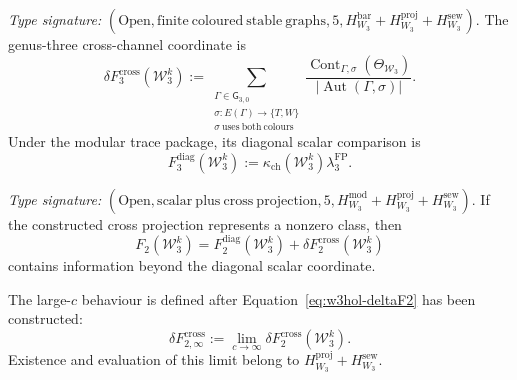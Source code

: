\begin{proposition}
\label{prop:w3hol-deltaF3-finite-window}
\emph{Type signature:}
\((\mathrm{Open},\mathrm{finite\ coloured\ stable\ graphs},5,
H_{W_3}^{\mathrm{bar}}+
H_{W_3}^{\mathrm{proj}}+
H_{W_3}^{\mathrm{sew}})\).
The genus-three cross-channel coordinate is
\begin{equation}\label{eq:w3hol-deltaF3}
\delta F_{3}^{\mathrm{cross}}(\mathcal W_3^k)
:=
\sum_{\substack{\Gamma\in\mathsf G_{3,0}\\
\sigma:E(\Gamma)\to\{T,W\}\\
\sigma\ \mathrm{uses\ both\ colours}}}
\frac{\operatorname{Cont}_{\Gamma,\sigma}(\Theta_{\mathcal W_3})}
{|\operatorname{Aut}(\Gamma,\sigma)|}.
\end{equation}
Under the modular trace package, its diagonal scalar comparison is
\begin{equation}\label{eq:w3hol-genus3-scalar}
F_3^{\mathrm{diag}}(\mathcal W_3^k)
:=
\kappa_{\mathrm{ch}}(\mathcal W_3^k)
\lambda_3^{\mathrm{FP}}.
\end{equation}
\end{proposition}

\begin{corollary}
\label{cor:w3hol-multi-gen-fails}
\emph{Type signature:}
\((\mathrm{Open},\mathrm{scalar\ plus\ cross\ projection},5,
H_{W_3}^{\mathrm{mod}}+
H_{W_3}^{\mathrm{proj}}+
H_{W_3}^{\mathrm{sew}})\).
If the constructed cross projection represents a nonzero class, then
\begin{equation}\label{eq:w3hol-genus2-rank-two-splitting}
F_2(\mathcal W_3^k)
=F_2^{\mathrm{diag}}(\mathcal W_3^k)
+\delta F_2^{\mathrm{cross}}(\mathcal W_3^k)
\end{equation}
contains information beyond the diagonal scalar coordinate.
\end{corollary}

\begin{remark}
\label{rem:w3hol-large-c}
The large-\(c\) behaviour is defined after
Equation~\eqref{eq:w3hol-deltaF2} has been constructed:
\begin{equation}\label{eq:w3hol-large-c}
\delta F_{2,\infty}^{\mathrm{cross}}
:=
\lim_{c\to\infty}
\delta F_2^{\mathrm{cross}}(\mathcal W_3^k).
\end{equation}
Existence and evaluation of this limit belong to
\(H_{W_3}^{\mathrm{proj}}+H_{W_3}^{\mathrm{sew}}\).
\end{remark}

